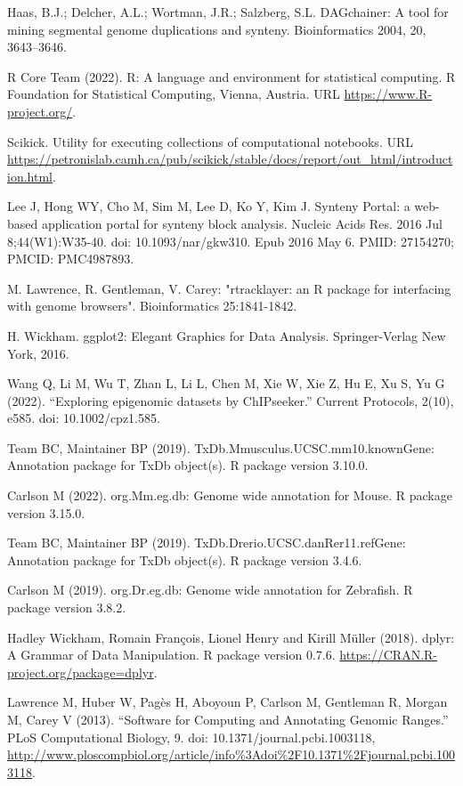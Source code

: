 \documentclass[12pt]{article}
\begin{document}
\begin{thebibliography}{99}
 Haas, B.J.; Delcher, A.L.; Wortman, J.R.; Salzberg, S.L.
DAGchainer: A tool for mining segmental genome duplications and synteny.
Bioinformatics 2004, 20, 3643–3646.

 R Core Team (2022).
R: A language and environment for statistical computing. R Foundation
for Statistical Computing, Vienna, Austria. URL
\url{https://www.R-project.org/}.

 Scikick. Utility for executing collections of computational
notebooks. URL
\url{https://petronislab.camh.ca/pub/scikick/stable/docs/report/out\_html/introduction.html}.

 Lee J, Hong WY, Cho M, Sim M, Lee D, Ko Y, Kim J. Synteny
Portal: a web-based application portal for synteny block analysis. Nucleic
Acids Res. 2016 Jul 8;44(W1):W35-40. doi: 10.1093/nar/gkw310. Epub 2016 May 6.
PMID: 27154270; PMCID: PMC4987893.

 M. Lawrence, R. Gentleman, V. Carey: "rtracklayer: an {R}
package for interfacing with genome browsers". Bioinformatics 25:1841-1842.

 H. Wickham. ggplot2: Elegant Graphics for Data Analysis.
Springer-Verlag New York, 2016.

 Wang Q, Li M, Wu T, Zhan L, Li L, Chen M, Xie W, Xie Z, Hu E,
Xu S, Yu G (2022). “Exploring epigenomic datasets by ChIPseeker.” Current
Protocols, 2(10), e585. doi: 10.1002/cpz1.585.

 Team BC, Maintainer BP (2019).
TxDb.Mmusculus.UCSC.mm10.knownGene: Annotation package for TxDb object(s).
R package version 3.10.0.

 Carlson M (2022). org.Mm.eg.db: Genome wide annotation for
Mouse. R package version 3.15.0.

 Team BC, Maintainer BP (2019).
TxDb.Drerio.UCSC.danRer11.refGene: Annotation package for TxDb object(s).
R package version 3.4.6.

 Carlson M (2019). org.Dr.eg.db: Genome wide annotation for
Zebrafish. R package version 3.8.2.

 Hadley Wickham, Romain François, Lionel Henry and Kirill Müller
(2018). dplyr: A Grammar of Data Manipulation. R package version 0.7.6.
\url{https://CRAN.R-project.org/package=dplyr}.

 Lawrence M, Huber W, Pagès H, Aboyoun P, Carlson M,
Gentleman R, Morgan M, Carey V (2013). “Software for Computing and Annotating
Genomic Ranges.” PLoS Computational Biology, 9.
doi: 10.1371/journal.pcbi.1003118,
\url{http://www.ploscompbiol.org/article/info%3Adoi%2F10.1371%2Fjournal.pcbi.1003118}.


\end{thebibliography}
\end{document}
